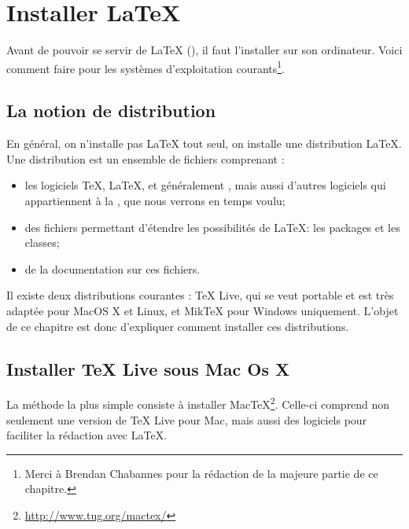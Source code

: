 \chapter {Installer \LaTeX{}}\label{install}

\begin{intro}
    Avant de pouvoir se servir de \LaTeX{} (\XeLaTeX), il faut l'installer sur son ordinateur. Voici comment faire pour les systèmes d'exploitation courants\footnote{Merci à Brendan Chabannes pour la rédaction de la majeure partie de ce chapitre.}.
\end{intro}

\section{La notion de distribution}

En général, on n'installe pas \LaTeX{} tout seul, on installe une distribution \LaTeX{}. Une distribution est un ensemble de fichiers comprenant :
\begin{itemize}
\item les logiciels \TeX, \LaTeX, et généralement \XeLaTeX, mais aussi d'autres logiciels qui appartiennent à la  , que nous verrons en temps voulu;
\item des fichiers permettant d'étendre les possibilités de \LaTeX : les packages et les classes;
\item de la documentation sur ces fichiers.
\end{itemize}

Il existe deux distributions courantes : TeX Live, qui se veut portable et est très adaptée pour MacOS X et Linux, et MikTeX pour Windows uniquement. L'objet de ce chapitre est donc d'expliquer comment installer ces distributions.

\section{Installer TeX Live sous Mac Os X}

La méthode la plus simple consiste à installer MacTeX\footnote{\url{http://www.tug.org/mactex/}}. Celle-ci comprend non seulement une version de TeX Live pour Mac, mais aussi des logiciels pour faciliter la rédaction avec \LaTeX{}.


